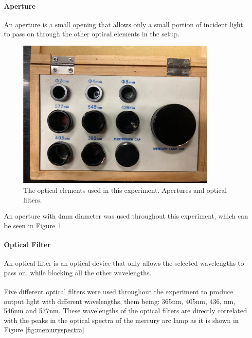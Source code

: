 			\paragraph{Aperture}
				An aperture is a small opening that allows only a small portion of incident light to pass on through the other optical elements in the setup. 
				\begin{figure}[H]
					\centering
					\includegraphics[width=10cm]{images/lens_aperture.jpeg}
					\caption{The optical elements used in this experiment. Apertures and optical filters.}
					\label{fig:opticalelements}
				\end{figure}
				An aperture with 4mm diameter was used throughout this experiment, which can be seen in Figure \ref{fig:opticalelements}
			\paragraph{Optical Filter}
				An optical filter is an optical device that only allows the selected wavelengths to pass on, while blocking all the other wavelengths.
				\\
				\\
				Five different optical filters were used throughout the experiment to produce output light with different wavelengths, them being: 365nm, 405nm, 436, nm, 546nm and 577nm. These wavelengths of the optical filters are directly correlated with the peaks in the optical spectra of the mercury arc lamp as it is shown in Figure \ref{fig:mercuryspectra}
